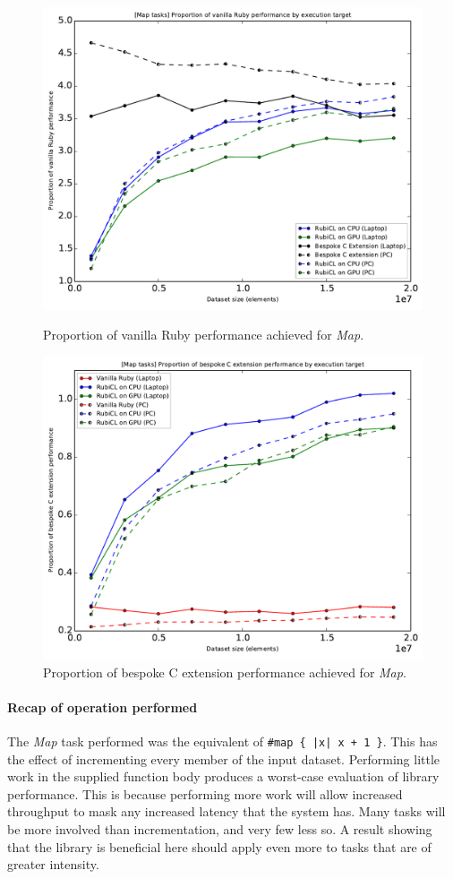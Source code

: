 \begin{figure}[H]
  \centering
  \includegraphics[width=\textwidth]{./graphing/just_map/prop_van.pdf}
  \caption{Proportion of vanilla Ruby performance achieved for \emph{Map}.}
  \label{fig:map_task_vperf_g}

  \includegraphics[width=\textwidth]{./graphing/just_map/prop_bes.pdf}
  \caption{Proportion of bespoke C extension performance achieved for \emph{Map}.}
  \label{fig:map_task_bperf_g}
\end{figure}
\paragraph*{Recap of operation performed}
The \emph{Map} task performed was the equivalent of \verb!#map { |x| x + 1 }!. This has the effect of incrementing every member of the input dataset.
Performing little work in the supplied function body produces a worst-case evaluation of library performance. This is because performing more work will allow increased throughput to mask any increased latency that the system has. Many tasks will be more involved than incrementation, and very few less so. A result showing that the library is beneficial here should apply even more to tasks that are of greater intensity.

